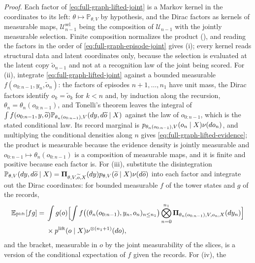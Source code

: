 \noindent\emph{Proof.}
Each factor of \eqref{eq:full-graph-lifted-joint} is a Markov kernel in the
coordinates to its left: $\theta\mapsto\mathbb P_{\theta,V}$ by hypothesis, and the
Dirac factors as kernels of measurable maps, $\mathcal U^{\mathrm{sel}}_{n-1}$ being
the composition of $\mathcal U_{n-1}$ with the jointly measurable selection. Finite
composition normalizes the product (), and reading
the factors in the order of \eqref{eq:full-graph-episode-joint} gives (i); every kernel
reads structural data and latent coordinates only, because the selection is evaluated
at the latent copy $\widetilde o_{n-1}$ and not at a recognition law of the joint being
scored. For (ii), integrate \eqref{eq:full-graph-lifted-joint} against a bounded
measurable $f(o_{0:n-1},y_n,\widetilde o_n)$: the factors of episodes $n+1,\ldots,n_1$
have unit mass, the Dirac factors identify $o_k=\widetilde o_k$ for $k<n$ and, by
induction along the recursion, $\theta_n=\theta_n(o_{0:n-1})$, and Tonelli's theorem
leaves the integral of
$\int f(o_{0:n-1},y,\widetilde o)\mathbb P_{\theta_n(o_{0:n-1}),V}(dy,d\widetilde o\mid X)$
against the law of $o_{0:n-1}$, which is the stated conditional law. Its record
marginal is $p_{\theta_n(o_{0:n-1}),V}(o_n\mid X)\nu(do_n)$, and multiplying the
conditional densities along $n$ gives \eqref{eq:full-graph-lifted-evidence}; the
product is measurable because the evidence density is jointly measurable and
$o_{0:n-1}\mapsto\theta_n(o_{0:n-1})$ is a composition of measurable maps, and it is
finite and positive because each factor is. For (iii), substitute the disintegration
$\mathbb P_{\theta,V}(dy,d\widetilde o\mid X)
=\boldsymbol\Pi_{\theta,V,\widetilde o,X}(dy)p_{\theta,V}(\widetilde o\mid X)\nu(d\widetilde o)$
into each factor and integrate out the Dirac coordinates: for bounded measurable
$f$ of the tower states and $g$ of the records,
\begin{equation}
\begin{aligned}
\mathbb E_{\mathbb P^{\mathrm{lift}}}[fg]
={}&\int g(o)\Bigl[\int f\bigl((\theta_n(o_{0:n-1}),y_n,o_n)_{n\le n_1}\bigr)
\bigotimes_{n=0}^{n_1}\boldsymbol\Pi_{\theta_n(o_{0:n-1}),V,o_n,X}(dy_n)\Bigr]\\
&\times p^{\mathrm{lift}}(o\mid X)\nu^{\otimes(n_1+1)}(do),
\end{aligned}
\label{eq:full-graph-lifted-posterior}
\end{equation}
and the bracket, measurable in $o$ by the joint measurability of the slices, is a
version of the conditional expectation of $f$ given the records. For (iv), the
